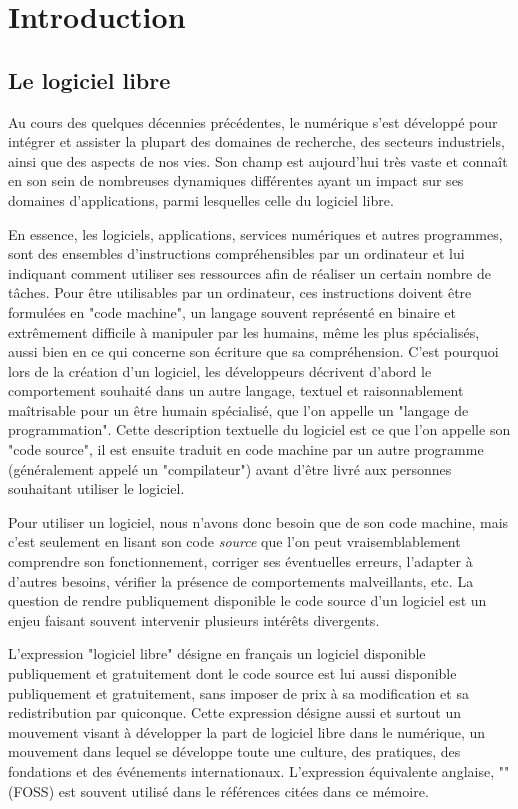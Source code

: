 \chapter{Introduction}

\section{Le logiciel libre}

Au cours des quelques décennies précédentes, le numérique s'est développé pour intégrer et assister la plupart
des domaines de recherche, des secteurs industriels, ainsi que des aspects de nos vies. Son champ est
aujourd'hui très vaste et connaît en son sein de nombreuses dynamiques différentes ayant un impact sur ses
domaines d'applications, parmi lesquelles celle du logiciel libre.

En essence, les logiciels, applications, services numériques et autres programmes, sont des ensembles
d'instructions compréhensibles par un ordinateur et lui indiquant comment utiliser ses ressources afin de
réaliser un certain nombre de tâches. Pour être utilisables par un ordinateur, ces instructions doivent être
formulées en "code machine", un langage souvent représenté en binaire et extrêmement difficile à manipuler par
les humains, même les plus spécialisés, aussi bien en ce qui concerne son écriture que sa compréhension. C'est
pourquoi lors de la création d'un logiciel, les développeurs décrivent d'abord le comportement souhaité dans
un autre langage, textuel et raisonnablement maîtrisable pour un être humain spécialisé, que l'on appelle un
"langage de programmation". Cette description textuelle du logiciel est ce que l'on appelle son "code source",
il est ensuite traduit en code machine par un autre programme (généralement appelé un "compilateur") avant
d'être livré aux personnes souhaitant utiliser le logiciel.

Pour utiliser un logiciel, nous n'avons donc besoin que de son code machine, mais c'est seulement en lisant
son code \emph{source} que l'on peut vraisemblablement comprendre son fonctionnement, corriger ses éventuelles
erreurs, l'adapter à d'autres besoins, vérifier la présence de comportements malveillants, etc. La question de
rendre publiquement disponible le code source d'un logiciel est un enjeu faisant souvent intervenir plusieurs
intérêts divergents.

L'expression "logiciel libre" désigne en français un logiciel disponible publiquement et gratuitement dont le
code source est lui aussi disponible publiquement et gratuitement, sans imposer de prix à sa modification et
sa redistribution par quiconque. Cette expression désigne aussi et surtout un mouvement visant à développer la
part de logiciel libre dans le numérique, un mouvement dans lequel se développe toute une culture, des
pratiques, des fondations et des événements internationaux. L'expression équivalente anglaise, "" (FOSS) est souvent utilisé dans le références citées dans ce mémoire.

